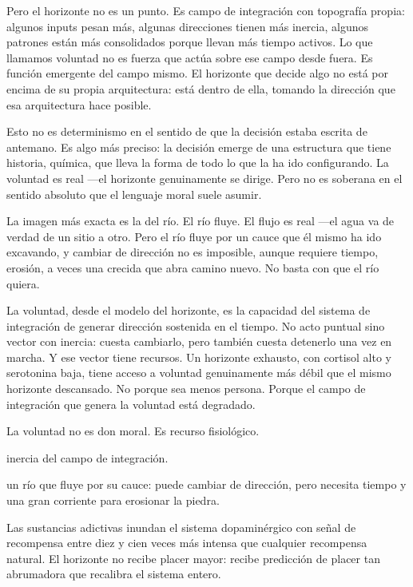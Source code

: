 Pero el horizonte no es un punto. Es campo de integración con topografía propia: algunos inputs pesan más, algunas direcciones tienen más inercia, algunos patrones están más consolidados porque llevan más tiempo activos. Lo que llamamos voluntad no es fuerza que actúa sobre ese campo desde fuera. Es función emergente del campo mismo. El horizonte que decide algo no está por encima de su propia arquitectura: está dentro de ella, tomando la dirección que esa arquitectura hace posible.

Esto no es determinismo en el sentido de que la decisión estaba escrita de antemano. Es algo más preciso: la decisión emerge de una estructura que tiene historia, química, que lleva la forma de todo lo que la ha ido configurando. La voluntad es real —el horizonte genuinamente se dirige. Pero no es soberana en el sentido absoluto que el lenguaje moral suele asumir.

La imagen más exacta es la del río. El río fluye. El flujo es real —el agua va de verdad de un sitio a otro. Pero el río fluye por un cauce que él mismo ha ido excavando, y cambiar de dirección no es imposible, aunque requiere tiempo, erosión, a veces una crecida que abra camino nuevo. No basta con que el río quiera.

La voluntad, desde el modelo del horizonte, es la capacidad del sistema de integración de generar dirección sostenida en el tiempo. No acto puntual sino vector con inercia: cuesta cambiarlo, pero también cuesta detenerlo una vez en marcha. Y ese vector tiene recursos. Un horizonte exhausto, con cortisol alto y serotonina baja, tiene acceso a voluntad genuinamente más débil que el mismo horizonte descansado. No porque sea menos persona. Porque el campo de integración que genera la voluntad está degradado.

La voluntad no es don moral. Es recurso fisiológico.

\begin{fisica}
 inercia del campo de integración.

 un río que fluye por su cauce: puede cambiar de dirección, pero necesita tiempo y una gran corriente para erosionar la piedra.
\end{fisica}
\noindent Las sustancias adictivas inundan el sistema dopaminérgico con señal de recompensa entre diez y cien veces más intensa que cualquier recompensa natural. El horizonte no recibe placer mayor: recibe predicción de placer tan abrumadora que recalibra el sistema entero.

